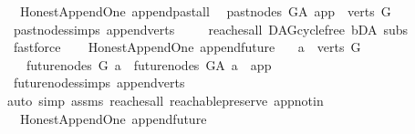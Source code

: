 \begin{isabellebody}
%
\endisadelimproof
\isanewline
{}\isamarkupfalse%
\ {\isacharparenleft}{\kern0pt}\ Honest{\isacharunderscore}{\kern0pt}Append{\isacharunderscore}{\kern0pt}One{\isacharparenright}{\kern0pt}\ append{\isacharunderscore}{\kern0pt}past{\isacharunderscore}{\kern0pt}all{\isacharcolon}{\kern0pt}\isanewline
\ \ {\isachardoublequoteopen}past{\isacharunderscore}{\kern0pt}nodes\ G{\isacharunderscore}{\kern0pt}A\ app\ {\isacharequal}{\kern0pt}\ verts\ G{\isachardoublequoteclose}\isanewline
%
\isadelimproof
\ \ %
\endisadelimproof
%
\isatagproof
{}\isamarkupfalse%
\ past{\isacharunderscore}{\kern0pt}nodes{\isachardot}{\kern0pt}simps\ append{\isacharunderscore}{\kern0pt}verts\ \isanewline
\ \ \isamarkupfalse%
\ reaches{\isacharunderscore}{\kern0pt}all\ DAG{\isachardot}{\kern0pt}cycle{\isacharunderscore}{\kern0pt}free\ bD{\isacharunderscore}{\kern0pt}A\ subs\isanewline
\ \ \isamarkupfalse%
\ fastforce%
\endisatagproof
{\isafoldproof}%
%
\isadelimproof
\ \isanewline
%
\endisadelimproof
\isanewline
{}\isamarkupfalse%
\ {\isacharparenleft}{\kern0pt}\ Honest{\isacharunderscore}{\kern0pt}Append{\isacharunderscore}{\kern0pt}One{\isacharparenright}{\kern0pt}\ append{\isacharunderscore}{\kern0pt}future{\isacharcolon}{\kern0pt}\isanewline
\ \ \ {\isachardoublequoteopen}a\ {\isasymin}\ verts\ G{\isachardoublequoteclose}\isanewline
\ \ \ {\isachardoublequoteopen}future{\isacharunderscore}{\kern0pt}nodes\ G\ a\ {\isacharequal}{\kern0pt}\ future{\isacharunderscore}{\kern0pt}nodes\ G{\isacharunderscore}{\kern0pt}A\ a\ {\isacharminus}{\kern0pt}\ {\isacharbraceleft}{\kern0pt}app{\isacharbraceright}{\kern0pt}{\isachardoublequoteclose}\isanewline
%
\isadelimproof
\ \ %
\endisadelimproof
%
\isatagproof
{}\isamarkupfalse%
\ future{\isacharunderscore}{\kern0pt}nodes{\isachardot}{\kern0pt}simps\ append{\isacharunderscore}{\kern0pt}verts\isanewline
{}\isamarkupfalse%
{\isacharparenleft}{\kern0pt}auto\ simp{\isacharcolon}{\kern0pt}\ assms\ reaches{\isacharunderscore}{\kern0pt}all\ reachable{}{\isacharunderscore}{\kern0pt}preserve\ app{\isacharunderscore}{\kern0pt}notin{\isacharparenright}{\kern0pt}\ \isamarkupfalse%
%
\endisatagproof
{\isafoldproof}%
%
\isadelimproof
\isanewline
%
\endisadelimproof
\isanewline
{}\isamarkupfalse%
\ {\isacharparenleft}{\kern0pt}\ Honest{\isacharunderscore}{\kern0pt}Append{\isacharunderscore}{\kern0pt}One{\isacharparenright}{\kern0pt}\ append{\isacharunderscore}{\kern0pt}future{}{\isacharcolon}{\kern0pt}\isanewline

\end{isabellebody}

